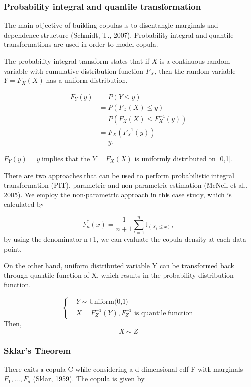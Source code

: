\documentclass[12pt,a4paper]{article}
\numberwithin{equation}{section}
\begin{document}
\subsubsection{Probability integral and quantile transformation}
The main objective of building copulas is to disentangle marginals and dependence structure (Schmidt, T., 2007). Probability integral and quantile transformations are used in order to model copula. 

The probability integral transform states that if $X$ is a continuous random variable with cumulative distribution function $F_X$, then the random variable $Y = F_X(X)$ has a uniform distribution.

\begin{align*}
F_Y(y) &= P(Y \leq y) \\
          &= P(F_X(X) \leq y) \\
          &= P(F_X(X) \leq F_X^{-1}(y)) \\
          &= F_X(F_X^{-1}(y)) \\
          &= y.
\end{align*}



$F_Y(y) = y$ implies that the $Y = F_X(X)$ is uniformly distributed on [0,1].

There are two approaches that can be used to perform probabilistic integral transformation (PIT), parametric and non-parametric estimation (McNeil et al., 2005). We employ the non-parametric approach in this case study, which is calculated by

\[F_{n}^*(x) = \frac{1}{n+1} \sum_{t=1}^{n} \mathbb{I}_{(X_t \leq x)},\]
by using the denominator n+1, we can evaluate the copula density at each data point.

On the other hand, uniform distributed variable Y can be transformed back through quantile function of X, which results in the probability distribution function. 

\begin{equation}
\begin{cases}
 & Y \sim \text{Uniform(0,1)}\\
 & X = F_Z^{-1}(Y), \text{$F_Z^{-1}$ is quantile function}
 \end{cases}
 \end{equation}
 Then, 
 \[  X \sim Z\]
 
 \subsubsection{Sklar's Theorem}
 There exits a copula C while considering a d-dimensional cdf F with marginals $F_1, ..., F_d$ (Sklar, 1959). The copula is given by
 
\end{document}
